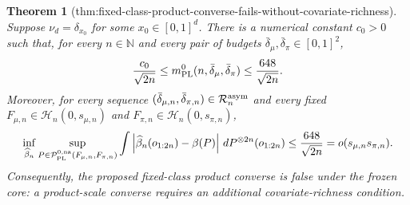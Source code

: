 \documentclass{article}
\newtheorem{theorem}{Theorem}
\begin{document}
\begin{theorem}[thm:fixed-class-product-converse-fails-without-covariate-richness]\label{thm:fixed-class-product-converse-fails-without-covariate-richness}
Suppose \(\nu_d=\delta_{x_0}\) for some \(x_0\in[0,1]^d\). There is a numerical constant \(c_0>0\) such that, for every \(n\in\mathbb N\) and every pair of budgets \(\bar\delta_\mu,\bar\delta_\pi\in[0,1]^2\),
\[
\frac{c_0}{\sqrt{2n}}\le m_{\rm PL}^{0}(n,\bar\delta_\mu,\bar\delta_\pi)\le\frac{648}{\sqrt{2n}}.
\]
Moreover, for every sequence \((\bar\delta_{\mu,n},\bar\delta_{\pi,n})\in\mathcal R_n^{\rm asym}\) and every fixed \(F_{\mu,n}\in\mathcal H_n(0,s_{\mu,n})\) and \(F_{\pi,n}\in\mathcal H_n(0,s_{\pi,n})\),
\[
\makebox[\linewidth][c]{\resizebox{0.98\linewidth}{!}{\par\noindent \makebox[\linewidth][c]{\resizebox{0.98\linewidth}{!}{\(\displaystyle \displaystyle \inf_{\widehat\beta_n}\sup_{P\in\mathcal P_{\rm PL}^{0,\rm na}(F_{\mu,n},F_{\pi,n})}\int\left|\widehat\beta_n(o_{1:2n})-\beta(P)\right|\,dP^{\otimes2n}(o_{1:2n})\le\frac{648}{\sqrt{2n}}=o(s_{\mu,n}s_{\pi,n}).\)}}\par\noindent}}
\]
Consequently, the proposed fixed-class product converse is false under the frozen core: a product-scale converse requires an additional covariate-richness condition.
\end{theorem}
\end{document}
